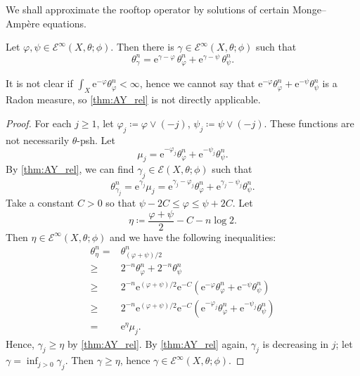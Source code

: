 We shall approximate the rooftop operator by solutions of certain Monge--Ampère equations.
\begin{lemma}\label{lma:rooftop_MAequation}
	Let $\varphi,\psi\in \mathcal{E}^{\infty}(X,\theta;\phi)$. Then there is $\gamma\in \mathcal{E}^{\infty}(X,\theta;\phi)$ such that
	\begin{equation}\label{eq:solution_thetavarphiephiu}
		\theta_{\gamma}^n=\mathrm{e}^{\gamma-\varphi}\,\theta_{\varphi}^n+\mathrm{e}^{\gamma-\psi}\,\theta_{\psi}^n.
	\end{equation}
\end{lemma}
It is not clear if $\int_X\mathrm{e}^{-\varphi}\theta_{\varphi}^n<\infty$, hence we cannot say that $\mathrm{e}^{-\varphi}\theta_{\varphi}^n+\mathrm{e}^{-\psi}\theta_{\psi}^n$ is a Radon measure, so \cref{thm:AY_rel} is not directly applicable.
\begin{proof}
	For each $j\geq 1$, let $\varphi_j\coloneqq \varphi\lor(-j)$, $\psi_j\coloneqq \psi\lor(-j)$. These functions are not necessarily $\theta$-psh.
	Let
	\[
	\mu_j=\mathrm{e}^{-\varphi_j}\theta_{\varphi}^n+\mathrm{e}^{-\psi_j}\theta_{\psi}^n.
	\]
	By \cref{thm:AY_rel}, we can find $\gamma_j\in \mathcal{E}(X,\theta;\phi)$ such that
	\begin{equation}\label{eq:thetagammaj_temp1}
		\theta_{\gamma_j}^n=\mathrm{e}^{\gamma_j}\mu_j=\mathrm{e}^{\gamma_j-\varphi_j}\theta_{\varphi}^n+\mathrm{e}^{\gamma_j-\psi_j}\theta_{\psi}^n.
	\end{equation}
	Take a constant $C>0$ so that $\psi-2C\leq \varphi\leq \psi+2C$.
	Let
	\[
	\eta\coloneqq \frac{\varphi+\psi}{2}-C-n\log 2.
	\]
	Then $\eta\in \mathcal{E}^{\infty}(X,\theta;\phi)$ and we have the following inequalities:
    \[
    \begin{aligned}
    \theta_{\eta}^n =& \theta_{(\varphi+\psi)/2}^n\\
    \geq & 2^{-n}\theta_{\varphi}^n+2^{-n}\theta_{\psi}^n\\
    \geq & 2^{-n}\mathrm{e}^{(\varphi+\psi)/2}\mathrm{e}^{-C}\left( \mathrm{e}^{-\varphi}\theta_{\varphi}^n+\mathrm{e}^{-\psi}\theta_{\psi}^n \right)\\
    \geq & 2^{-n}\mathrm{e}^{(\varphi+\psi)/2}\mathrm{e}^{-C}\left( \mathrm{e}^{-\varphi_j}\theta_{\varphi}^n+\mathrm{e}^{-\psi_j}\theta_{\psi}^n \right)\\
    = &
    \mathrm{e}^{\eta}\mu_j.
    \end{aligned}
    \]
	Hence, $\gamma_j\geq \eta$ by \cref{thm:AY_rel}. By \cref{thm:AY_rel} again, $\gamma_j$ is decreasing in $j$; let $\gamma=\inf_{j>0}\gamma_j$.
	Then $\gamma\geq \eta$, hence $\gamma\in \mathcal{E}^{\infty}(X,\theta;\phi)$.


\end{proof}
